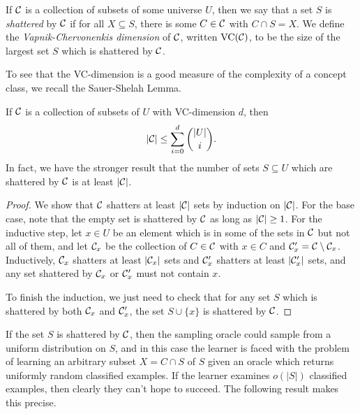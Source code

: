 \documentclass[letterpaper,11pt]{article}
\begin{document}
\begin{defn} If $\mathcal{C}$ is a collection of subsets of some universe $U$, then we say that a set $S$ is \emph{shattered} by $\mathcal{C}$ if for all $X \subseteq S$, there is some $C \in \mathcal{C}$ with $C \cap S = X$. We define the \emph{Vapnik-Chervonenkis dimension} of $\mathcal{C}$, written $\operatorname{VC}(\mathcal{C})$, to be the size of the largest set $S$ which is shattered by $\mathcal{C}$.
\end{defn}

To see that the VC-dimension is a good measure of the complexity of a concept class, we recall the Sauer-Shelah Lemma.

\begin{lem}\label{sauer-shelah} If $\mathcal{C}$ is a collection of subsets of $U$ with VC-dimension $d$, then
\[
|\mathcal{C}| \le \sum_{i = 0}^d \binom{|U|}{i}.
\]
In fact, we have the stronger result that the number of sets $S \subseteq U$ which are shattered by $\mathcal{C}$ is at least $|\mathcal{C}|$.
\end{lem}
\begin{proof} We show that $\mathcal{C}$ shatters at least $|\mathcal{C}|$ sets by induction on $|\mathcal{C}|$. For the base case, note that the empty set is shattered by $\mathcal{C}$ as long as $|\mathcal{C}| \ge 1$. For the inductive step, let $x \in U$ be an element which is in some of the sets in $\mathcal{C}$ but not all of them, and let $\mathcal{C}_x$ be the collection of $C \in \mathcal{C}$ with $x \in C$ and $\mathcal{C}_x' = \mathcal{C} \setminus \mathcal{C}_x$. Inductively, $\mathcal{C}_x$ shatters at least $|\mathcal{C}_x|$ sets and $\mathcal{C}_x'$ shatters at least $|\mathcal{C}_x'|$ sets, and any set shattered by $\mathcal{C}_x$ or $\mathcal{C}_x'$ must not contain $x$.

To finish the induction, we just need to check that for any set $S$ which is shattered by both $\mathcal{C}_x$ and $\mathcal{C}_x'$, the set $S\cup \{x\}$ is shattered by $\mathcal{C}$.
\end{proof}

If the set $S$ is shattered by $\mathcal{C}$, then the sampling oracle could sample from a uniform distribution on $S$, and in this case the learner is faced with the problem of learning an arbitrary subset $X = C \cap S$ of $S$ given an oracle which returns uniformly random classified examples. If the learner examines $o(|S|)$ classified examples, then clearly they can't hope to succeed. The following result makes this precise.
\end{document}
